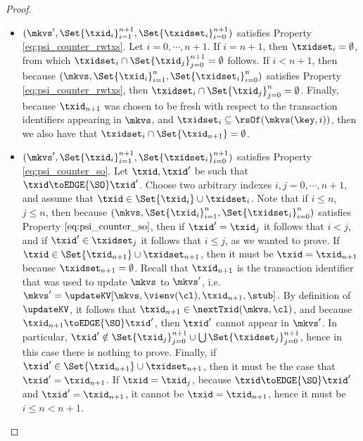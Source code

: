 \begin{proof}
\begin{itemize}
\begin{itemize}
\item $(\mkvs', \Set{\txid_{i}}_{i=1}^{n+1}, \Set{\txidset_{i}}_{i=0}^{n+1})$ 
satisfies Property \eqref{eq:psi_counter_rwtxs}. Let $i =0, \cdots, n+1$. If $i = n+1$, then 
$\txidset_{i} = \emptyset$, from which $\txidset_{i} \cap \Set{\txid_{j}}_{j=0}^{n+1} = \emptyset$ follows. If $i < n+1$, then 
because $(\mkvs, \Set{\txid_{i}}_{i=1}^{n}, \Set{\txidset_{i}}_{i=0}^{n})$ 
satisfies Property \eqref{eq:psi_counter_rwtxs}, then $\txidset_{i} \cap \Set{\txid_{j}}_{j=0}^{n} = \emptyset$. 
Finally, because $\txid_{n+1}$ was chosen to be fresh with respect to the transaction identifiers appearing in 
$\mkvs$, and $\txidset_{i} \subseteq \rsOf(\mkvs(\key, i))$, then  we also have that $\txidset_{i} \cap \Set{\txid_{n+1}} = \emptyset$. 
\item $(\mkvs', \Set{\txid_{i}}_{i=1}^{n+1}, \Set{\txidset_{i}}_{i=0}^{n+1})$ satisfies Property \eqref{eq:psi_counter_so}. Let 
$\txid, \txid'$ be such that $\txid \toEDGE{\SO} \txid'$. Choose two arbitrary indexes $i,j=0,\cdots, n+1$, 
and assume that $\txid \in \Set{\txid_{i}} \cup \txidset_{i}$. Note that if $i \leq n$, $j \leq n$, then 
because $(\mkvs, \Set{\txid_{i}}_{i=1}^{n}, \Set{\txidset_{i}}_{i=0}^{n})$ satisfies Property $\eqref{eq:psi_counter_so}$, then 
if $\txid' = \txid_{j}$ it follows that $i < j$, and if $\txid' \in \txidset_{j}$ it follows that $i \leq j$, as 
we wanted to prove. 
If $\txid \in \Set{\txid_{n+1}} \cup \txidset_{n+1}$, then it must be $\txid = \txid_{n+1}$ because 
$\txidset_{n+1} = \emptyset$. Recall that $\txid_{n+1}$ is the transaction identifier that was used 
to update $\mkvs$ to $\mkvs'$, i.e. $\mkvs' = \updateKV[\mkvs, \vienv(\cl), \txid_{n+1}, \stub]$. By 
definition of $\updateKV$, it follows that $\txid_{n+1} \in \nextTxid(\mkvs, \cl)$, 
and because $\txid_{n+1} \toEDGE{\SO} \txid'$, then $\txid'$ cannot appear in $\mkvs'$. 
In particular, 
$\txid' \notin \Set{\txid_{j}}_{j=0}^{n+1} \cup \bigcup \Set{\txidset_{j}}_{j=0}^{n+1}$, hence in this case there is nothing to prove. 
Finally, if $\txid' \in \Set{\txid_{n+1}} \cup \txidset_{n+1}$, then 
it must be the case that $\txid' = \txid_{n+1}$. If $\txid = \txid_{j}$, because 
$\txid \toEDGE{\SO} \txid'$ and $\txid' = \txid_{n+1}$, it cannot be $\txid = \txid_{n+1}$, 
hence it must be $i \leq n < n+1$. 

\end{itemize}
\end{itemize}
\end{proof}
